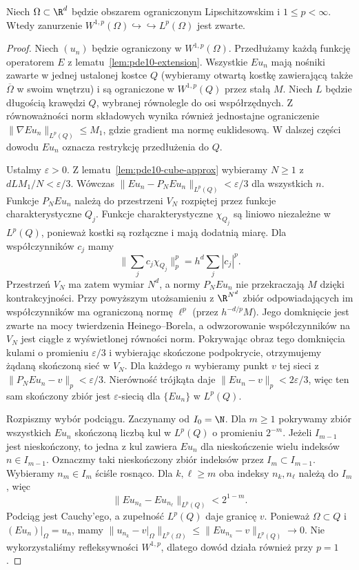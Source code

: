 \begin{twierdzenie}
\label{thm:pde10-Rellich-p}
Niech $\Omega\subset\R^d$ będzie obszarem ograniczonym Lipschitzowskim i $1\le p<\infty$. Wtedy zanurzenie
$W^{1,p}(\Omega)\hookrightarrow\hookrightarrow L^p(\Omega)$
jest zwarte.
\end{twierdzenie}
\begin{proof}
Niech $(u_n)$ będzie ograniczony w $W^{1,p}(\Omega)$.
Przedłużamy każdą funkcję operatorem
$E$ z lematu~\ref{lem:pde10-extension}. Wszystkie
$Eu_n$ mają nośniki zawarte w jednej ustalonej kostce $Q$
(wybieramy otwartą kostkę zawierającą także
$\overline\Omega$ w swoim wnętrzu) i są ograniczone
w $W^{1,p}(Q)$ przez stałą $M$.
Niech $L$ będzie długością krawędzi $Q$, wybranej
równolegle do osi współrzędnych. Z równoważności norm
składowych wynika również jednostajne ograniczenie
$\|\nabla Eu_n\|_{L^p(Q)}\le M_1$, gdzie gradient ma
normę euklidesową. W dalszej części dowodu $Eu_n$
oznacza restrykcję przedłużenia do $Q$.

Ustalmy $\varepsilon>0$. Z lematu~\ref{lem:pde10-cube-approx}
wybieramy $N\ge1$ z $dLM_1/N<\varepsilon/3$.
Wówczas $\|Eu_n-P_NEu_n\|_{L^p(Q)}<\varepsilon/3$
dla wszystkich $n$. Funkcje $P_NEu_n$ należą do
przestrzeni $V_N$ rozpiętej przez funkcje charakterystyczne
$Q_j$. Funkcje charakterystyczne $\chi_{Q_j}$ są
liniowo niezależne w $L^p(Q)$, ponieważ kostki
są rozłączne i mają dodatnią miarę.
Dla współczynników $c_j$ mamy
\[
 \Big\|\sum_j c_j\chi_{Q_j}\Big\|_p^p
 =h^d\sum_j |c_j|^p.
\]
Przestrzeń $V_N$ ma zatem wymiar $N^d$,
a normy $P_NEu_n$ nie przekraczają $M$ dzięki
kontrakcyjności. Przy powyższym utożsamieniu
z $\R^{N^d}$ zbiór odpowiadających im współczynników
ma ograniczoną normę $\ell^p$ (przez $h^{-d/p}M$).
Jego domknięcie jest zwarte na mocy twierdzenia
Heinego--Borela, a odwzorowanie współczynników
na $V_N$ jest ciągłe z wyświetlonej równości norm.
Pokrywając obraz tego domknięcia kulami o promieniu
$\varepsilon/3$ i wybierając skończone podpokrycie,
otrzymujemy żądaną skończoną sieć w $V_N$.
Dla każdego $n$ wybieramy punkt $v$ tej sieci
z $\|P_NEu_n-v\|_p<\varepsilon/3$.
Nierówność trójkąta daje $\|Eu_n-v\|_p<2\varepsilon/3$,
więc ten sam skończony zbiór jest $\varepsilon$-siecią
dla $\{Eu_n\}$ w $L^p(Q)$.

Rozpiszmy wybór podciągu. Zaczynamy od $I_0=\N$.
Dla $m\ge1$ pokrywamy zbiór wszystkich $Eu_n$ skończoną
liczbą kul w $L^p(Q)$ o promieniu $2^{-m}$.
Jeżeli $I_{m-1}$ jest nieskończony, to jedna z kul
zawiera $Eu_n$ dla nieskończenie wielu indeksów
$n\in I_{m-1}$. Oznaczmy taki nieskończony zbiór
indeksów przez $I_m\subset I_{m-1}$.
Wybieramy $n_m\in I_m$ ściśle rosnąco.
Dla $k,\ell\ge m$ oba indeksy $n_k,n_\ell$ należą
do $I_m$, więc
\[
 \|Eu_{n_k}-Eu_{n_\ell}\|_{L^p(Q)}<2^{1-m}.
\]
Podciąg jest Cauchy'ego, a zupełność $L^p(Q)$ daje
granicę $v$. Ponieważ $\Omega\subset Q$ i
$(Eu_n)|_\Omega=u_n$, mamy
$\|u_{n_k}-v|_\Omega\|_{L^p(\Omega)}
\le\|Eu_{n_k}-v\|_{L^p(Q)}\to0$. Nie wykorzystaliśmy
refleksywności $W^{1,p}$, dlatego dowód działa również
przy $p=1$.
\end{proof}


